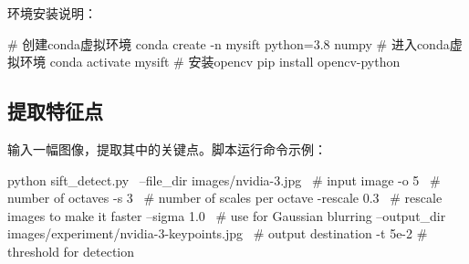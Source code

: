环境安装说明：
\begin{zshcode}
# 创建conda虚拟环境
conda create -n mysift python=3.8 numpy
# 进入conda虚拟环境
conda activate mysift
# 安装opencv
pip install opencv-python
\end{zshcode}

\subsection{提取特征点}

输入一幅图像，提取其中的\sift 关键点。脚本运行命令示例：
\begin{zshcode}
python sift_detect.py \
       --file_dir images/nvidia-3.jpg \ # input image
       -o 5 \ # number of octaves
       -s 3 \ # number of scales per octave
       -rescale 0.3 \ # rescale images to make it faster
       --sigma 1.0 \ # use for Gaussian blurring
       --output_dir images/experiment/nvidia-3-keypoints.jpg \ # output destination
       -t 5e-2 # threshold for detection
\end{zshcode}


